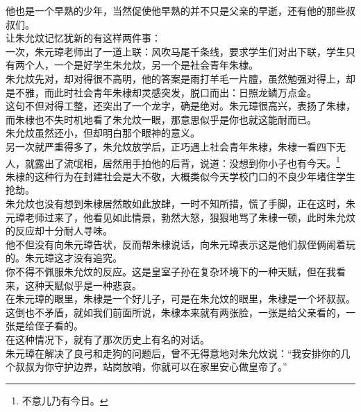 \begin{multicols}{\theparacolNo}
他也是一个早熟的少年，当然促使他早熟的并不只是父亲的早逝，还有他的那些叔叔们。\\

让朱允炆记忆犹新的有这样两件事：\\

一次，朱元璋老师出了一道上联：风吹马尾千条线，要求学生们对出下联，学生只有两个人，一个是好学生朱允炆，另一个是社会青年朱棣。\\

朱允炆先对，却对得很不高明，他的答案是雨打羊毛一片膻，虽然勉强对得上，却是不雅，而此时社会青年朱棣却灵感突发，脱口而出：日照龙鳞万点金。\\

这句不但对得工整，还突出了一个龙字，确是绝对。朱元璋很高兴，表扬了朱棣，而朱棣也不失时机地看了朱允炆一眼，那意思似乎是你也就这能耐而已。\\

朱允炆虽然还小，但却明白那个眼神的意义。\\

另一次就严重得多了，朱允炆放学后，正巧遇上社会青年朱棣，朱棣一看四下无人，就露出了流氓相，居然用手拍他的后背，说道：没想到你小子也有今天。\footnote{不意儿乃有今日。}\\

朱棣的这种行为在封建社会是大不敬，大概类似今天学校门口的不良少年堵住学生抢劫。\\

朱允炆也没有想到朱棣居然敢如此放肆，一时不知所措，慌了手脚，正在这时，朱元璋老师过来了，他看见如此情景，勃然大怒，狠狠地骂了朱棣一顿，此时朱允炆的反应却十分耐人寻味。\\

他不但没有向朱元璋告状，反而帮朱棣说话，向朱元璋表示这是他们叔侄俩闹着玩的。朱元璋这才没有追究。\\

你不得不佩服朱允炆的反应。这是皇室子孙在复杂环境下的一种天赋，但在我看来，这种天赋似乎是一种悲哀。\\

在朱元璋的眼里，朱棣是一个好儿子，可是在朱允炆的眼里，朱棣是一个坏叔叔。这倒也不矛盾，就如我们前面所说，朱棣本来就有两张脸，一张是给父亲看的，一张是给侄子看的。\\

在这种情况下，就有了那次历史上有名的对话。\\

朱元璋在解决了良弓和走狗的问题后，曾不无得意地对朱允炆说：“我安排你的几个叔叔为你守护边界，站岗放哨，你就可以在家里安心做皇帝了。”\\


\end{multicols}
